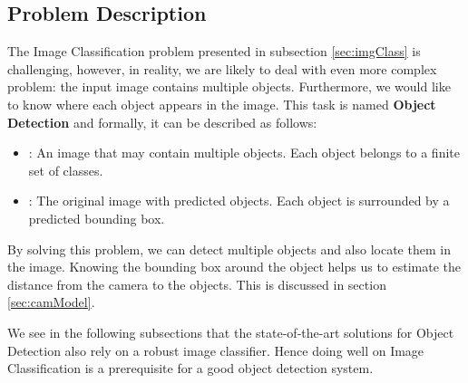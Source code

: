 \subsection{Problem Description}
The Image Classification problem presented in subsection \ref{sec:imgClass} is challenging, however, in reality, we are likely to deal with even more complex problem: the input image contains multiple objects. Furthermore, we would like to know where each object appears in the image. This task is named \textbf{Object Detection} and formally, it can be described as follows:
\begin{itemize}
	\item {}: An image that may contain multiple objects. Each object belongs to a finite set of classes.
	\item {}: The original image with predicted objects. Each object is surrounded by a predicted bounding box.
\end{itemize}
By solving this problem, we can detect multiple objects and also locate them in the image. Knowing the bounding box around the object helps us to estimate the distance from the camera to the objects. This is discussed in section \ref{sec:camModel}.

We see in the following subsections that the state-of-the-art solutions for Object Detection also rely on a robust image classifier. Hence doing well on Image Classification is a  prerequisite for a good object detection system.

